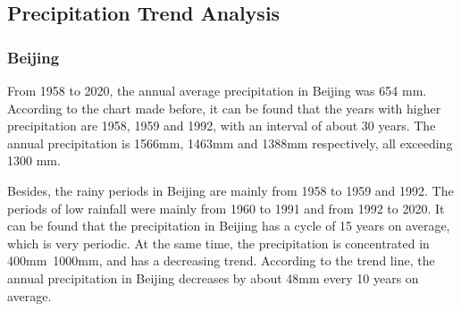\documentclass{swmcmthesis}
\begin{document}
\begin{figure}[h!t]
    \centering
    \hfill
\end{figure}


\subsection{Precipitation Trend Analysis}
\subsubsection{Beijing}
\hspace{1.25em}From 1958 to 2020, the annual average precipitation in Beijing was 654 mm. According to the chart made before, it can be found that the years with higher precipitation are 1958, 1959 and 1992, with an interval of about 30 years. The annual precipitation is 1566mm, 1463mm and 1388mm respectively, all exceeding 1300 mm.
\par 
Besides, the rainy periods in Beijing are mainly from 1958 to 1959 and 1992. The periods of low rainfall were mainly from 1960 to 1991 and from 1992 to 2020. It can be found that the precipitation in Beijing has a cycle of 15 years on average, which is very periodic. At the same time, the precipitation is concentrated in 400mm~1000mm, and has a decreasing trend. According to the trend line, the annual precipitation in Beijing decreases by about 48mm every 10 years on average.
\end{document}
